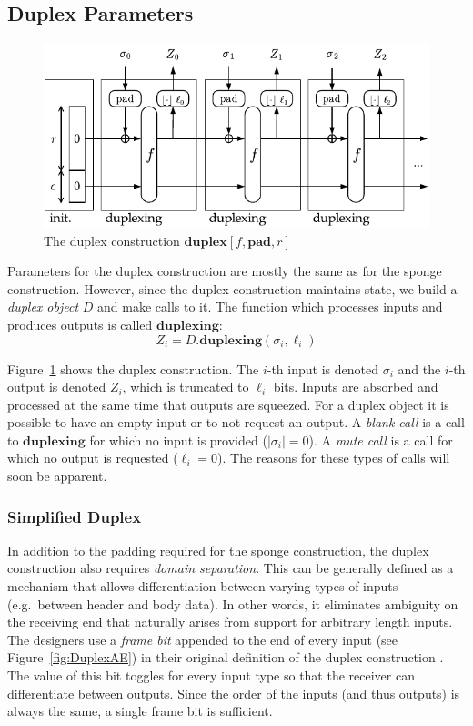 \subsection{Duplex Parameters}
\begin{figure}[ht]
\centering
\includegraphics[width=\textwidth]{img/Duplex.pdf}
\caption{The duplex construction $\mathbf{duplex}[f,\mathbf{pad},r]$ \cite{Bertoni2011_SpongeFunctions}}
\label{fig:Duplex}
\end{figure}

Parameters for the duplex construction are mostly the same as for the sponge construction.
However, since the duplex construction maintains state, we build a \emph{duplex object} $D$ and make calls to it.
The function which processes inputs and produces outputs is called $\mathbf{duplexing}$:
\begin{equation*}
Z_i = D.\mathbf{duplexing}(\sigma_i,\ell_i)
\end{equation*}

Figure~\ref{fig:Duplex} shows the duplex construction.
The $i$-th input is denoted $\sigma_i$ and the $i$-th output is denoted $Z_i$, which is truncated to $\ell_i$ bits.
Inputs are absorbed and processed at the same time that outputs are squeezed.
For a duplex object it is possible to have an empty input or to not request an output.
A \emph{blank call} is a call to $\mathbf{duplexing}$ for which no input is provided ($|\sigma_i| = 0$).
A \emph{mute call} is a call for which no output is requested ($\ell_i = 0$).
The reasons for these types of calls will soon be apparent.

\subsubsection{Simplified Duplex}
In addition to the padding required for the sponge construction, the duplex construction also requires \emph{domain separation}.
This can be generally defined as a mechanism that allows differentiation between varying types of inputs (e.g.\ between header and body data).
In other words, it eliminates ambiguity on the receiving end that naturally arises from support for arbitrary length inputs.
The \Keccak designers use a \emph{frame bit} appended to the end of every input (see Figure~\ref{fig:DuplexAE}) in their original definition of the duplex construction \cite{Bertoni2012_Duplexing}.
The value of this bit toggles for every input type so that the receiver can differentiate between outputs.
Since the order of the inputs (and thus outputs) is always the same, a single frame bit is sufficient.


